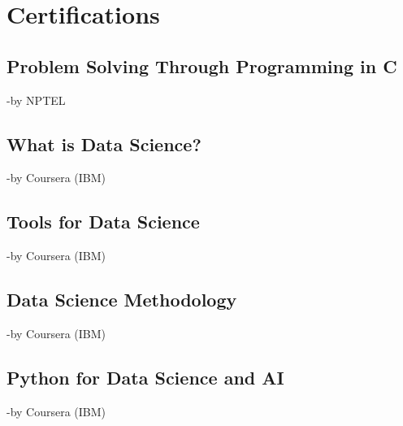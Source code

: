 \documentclass[]{deedy-resume-openfont}
\begin{document}
\begin{minipage}[t]{0.66\textwidth}




\section{Certifications} 
\sectionsep
\subsection{Problem Solving Through Programming in C}
-by NPTEL\\
\sectionsep

\sectionsep
\subsection{What is Data Science?}
-by Coursera (IBM)\\
\sectionsep

\sectionsep
\subsection{Tools for Data Science}
-by Coursera (IBM)\\
\sectionsep


\sectionsep
\subsection{Data Science Methodology}
-by Coursera (IBM)\\
\sectionsep

\sectionsep
\subsection{Python for Data Science and AI}
-by Coursera (IBM)\\
\sectionsep

\end{minipage} 
\end{document}
